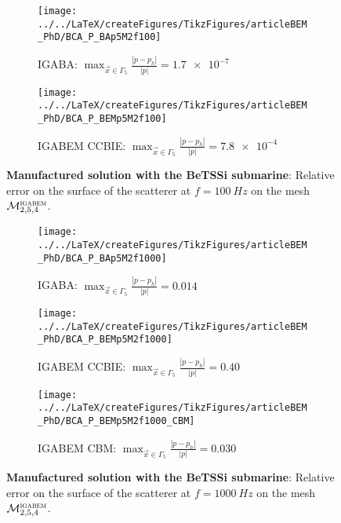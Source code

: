 \begin{figure}
	\centering
	\begin{subfigure}[t]{\textwidth}
		\texttt{[image: ../../LaTeX/createFigures/TikzFigures/articleBEM\_PhD/BCA\_P\_BAp5M2f100]}
		\caption{IGABA: $\displaystyle \max_{\vec{x}\in\Gamma_5}\frac{|p-p_h|}{|p|} = \num{1.7e-7}$}
	\end{subfigure} 
	\par\bigskip
	\begin{subfigure}[t]{\textwidth}
		\texttt{[image: ../../LaTeX/createFigures/TikzFigures/articleBEM\_PhD/BCA\_P\_BEMp5M2f100]}
		\caption{IGABEM CCBIE: $\displaystyle \max_{\vec{x}\in\Gamma_5}\frac{|p-p_h|}{|p|} = \num{7.8e-4}$}
	\end{subfigure} 
	\caption{\textbf{Manufactured solution with the BeTSSi submarine}: Relative error on the surface of the scatterer at $f=\SI{100}{Hz}$ on the mesh ${\cal M}_{2,5,4}^{\textsc{igabem}}$.}
	\label{Fig3:BCA_P_p5M2f100}
\end{figure}


\begin{figure}
	\centering
	\begin{subfigure}[t]{\textwidth}
		\texttt{[image: ../../LaTeX/createFigures/TikzFigures/articleBEM\_PhD/BCA\_P\_BAp5M2f1000]}
		\caption{IGABA: $\displaystyle \max_{\vec{x}\in\Gamma_5}\frac{|p-p_h|}{|p|} = 0.014$}
		\label{Fig3:BCA_P_p5M2f1000_BA}
	\end{subfigure} 
	\par\bigskip
	\begin{subfigure}[t]{\textwidth}
		\texttt{[image: ../../LaTeX/createFigures/TikzFigures/articleBEM\_PhD/BCA\_P\_BEMp5M2f1000]}
		\caption{IGABEM CCBIE: $\displaystyle \max_{\vec{x}\in\Gamma_5}\frac{|p-p_h|}{|p|} = 0.40$}
	\end{subfigure} 
	\par\bigskip
	\begin{subfigure}[t]{\textwidth}
		\texttt{[image: ../../LaTeX/createFigures/TikzFigures/articleBEM\_PhD/BCA\_P\_BEMp5M2f1000\_CBM]}
		\caption{IGABEM CBM: $\displaystyle \max_{\vec{x}\in\Gamma_5}\frac{|p-p_h|}{|p|} = 0.030$}
	\end{subfigure} 
	\caption{\textbf{Manufactured solution with the BeTSSi submarine}: Relative error on the surface of the scatterer at $f=\SI{1000}{Hz}$ on the mesh ${\cal M}_{2,5,4}^{\textsc{igabem}}$.}
	\label{Fig3:BCA_P_p5M2f1000}
\end{figure}

